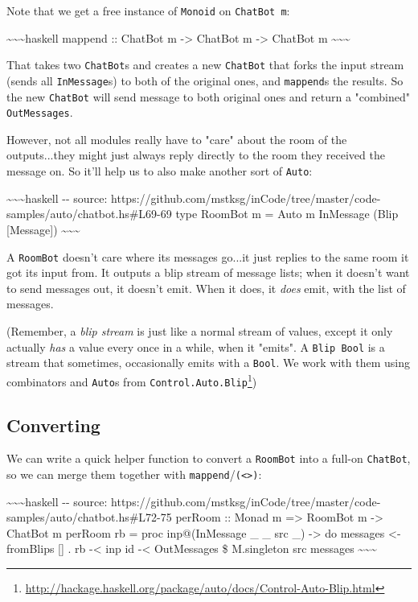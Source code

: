 \documentclass[]{article}
\renewcommand{\href}[2]{#2\footnote{\url{#1}}}
\begin{document}
Note that we get a free instance of \texttt{Monoid} on \texttt{ChatBot\ m}:

\textasciitilde{}\textasciitilde{}\textasciitilde{}haskell mappend :: ChatBot m
-\textgreater{} ChatBot m -\textgreater{} ChatBot m
\textasciitilde{}\textasciitilde{}\textasciitilde{}

That takes two \texttt{ChatBot}s and creates a new \texttt{ChatBot} that forks
the input stream (sends all \texttt{InMessage}s) to both of the original ones,
and \texttt{mappend}s the results. So the new \texttt{ChatBot} will send message
to both original ones and return a "combined" \texttt{OutMessages}.

However, not all modules really have to "care" about the room of the
outputs...they might just always reply directly to the room they received the
message on. So it'll help us to also make another sort of \texttt{Auto}:

\textasciitilde{}\textasciitilde{}\textasciitilde{}haskell -\/- source:
https://github.com/mstksg/inCode/tree/master/code-samples/auto/chatbot.hs\#L69-69
type RoomBot m = Auto m InMessage (Blip {[}Message{]})
\textasciitilde{}\textasciitilde{}\textasciitilde{}

A \texttt{RoomBot} doesn't care where its messages go...it just replies to the
same room it got its input from. It outputs a blip stream of message lists; when
it doesn't want to send messages out, it doesn't emit. When it does, it
\emph{does} emit, with the list of messages.

(Remember, a \emph{blip stream} is just like a normal stream of values, except
it only actually \emph{has} a value every once in a while, when it "emits". A
\texttt{Blip\ Bool} is a stream that sometimes, occasionally emits with a
\texttt{Bool}. We work with them using combinators and \texttt{Auto}s from
\href{http://hackage.haskell.org/package/auto/docs/Control-Auto-Blip.html}{\texttt{Control.Auto.Blip}})

\subsection{Converting}

We can write a quick helper function to convert a \texttt{RoomBot} into a
full-on \texttt{ChatBot}, so we can merge them together with
\texttt{mappend}/\texttt{(\textless{}\textgreater{})}:

\textasciitilde{}\textasciitilde{}\textasciitilde{}haskell -\/- source:
https://github.com/mstksg/inCode/tree/master/code-samples/auto/chatbot.hs\#L72-75
perRoom :: Monad m =\textgreater{} RoomBot m -\textgreater{} ChatBot m perRoom
rb = proc inp@(InMessage \_ \_ src \_) -\textgreater{} do messages \textless{}-
fromBlips {[}{]} . rb -\textless{} inp id -\textless{} OutMessages \$
M.singleton src messages \textasciitilde{}\textasciitilde{}\textasciitilde{}
\end{document}
